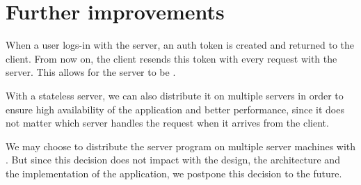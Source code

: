 \section{Further improvements}\label{sec:future}

When a user logs-in with the server, an auth token is created and returned to
the client. From now on, the client resends this token with every request with
the server. This allows for the server to be  .

With a stateless server, we can also distribute it on multiple servers in order
to ensure high availability of the application and better performance, since it
does not matter which server handles the request when it arrives from the
client.

We may choose to distribute the server program on multiple server machines with
. But since this decision does not impact with the
design, the architecture and the implementation of the application, we postpone
this decision to the future.
